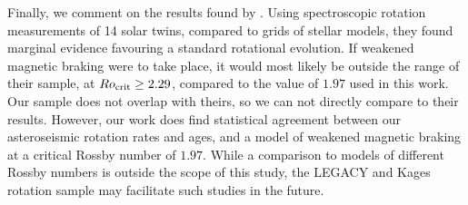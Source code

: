 Finally, we comment on the results found by \cite{lorenzo-oliveira+2019}. Using spectroscopic rotation measurements of 14 solar twins, compared to grids of stellar models, they found marginal evidence favouring a standard rotational evolution. If weakened magnetic braking were to take place, it would most likely be outside the range of their sample, at $Ro_{\rm {crit}} \geq 2.29$, compared to the value of $1.97$ used in this work. Our sample does not overlap with theirs, so we can not directly compare to their results. However, our work does find statistical agreement between our asteroseismic rotation rates and ages, and a model of weakened magnetic braking at a critical Rossby number of $1.97$. While a comparison to models of different Rossby numbers is outside the scope of this study, the LEGACY and Kages rotation sample may facilitate such studies in the future.
